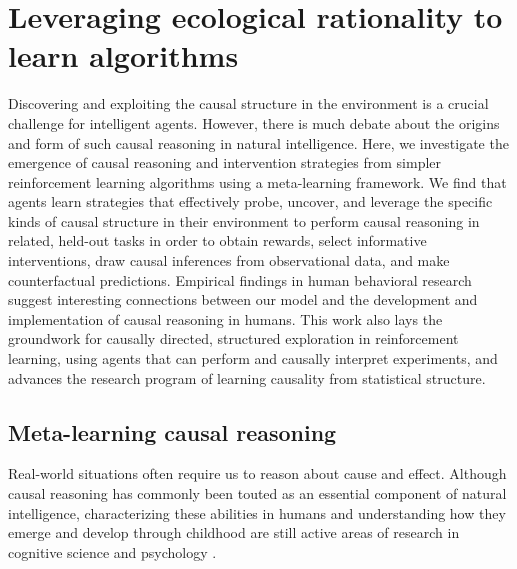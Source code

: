 \chapter{Leveraging ecological rationality to learn algorithms}
\label{chap:causal}

Discovering and exploiting the causal structure in the environment is a crucial challenge for intelligent agents. However, there is much debate about the origins and form of such causal reasoning in natural intelligence. Here, we investigate the emergence of causal reasoning and intervention strategies from simpler reinforcement learning algorithms using a meta-learning framework. We find that agents learn strategies that effectively probe, uncover, and leverage the specific kinds of causal structure in their environment to perform causal reasoning in related, held-out tasks in order to obtain rewards, select informative interventions, draw causal inferences from observational data, and make counterfactual predictions. Empirical findings in human behavioral research suggest interesting connections between our model and the development and implementation of causal reasoning in humans. This work also lays the groundwork for causally directed, structured exploration in reinforcement learning, using agents that can perform and causally interpret experiments, and advances the research program of learning causality from statistical structure.

\section{Meta-learning causal reasoning}

Real-world situations often require us to reason about cause and effect. Although causal reasoning has commonly been touted as an essential component of natural intelligence, characterizing these abilities in humans and understanding how they emerge and develop through childhood are still active areas of research in cognitive science and psychology \citep{waldmann2013causal, cartwright2004causation}. 


